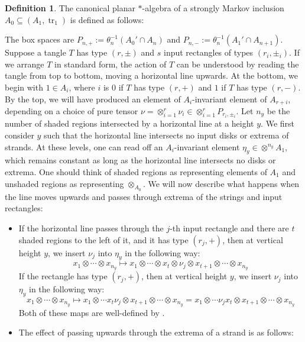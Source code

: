 \documentclass[11pt]{article}
\theoremstyle{plain}
\theoremstyle{definition}
\newtheorem{defn}[thm]{Definition}
\DeclareMathOperator{\tr}{tr}
\begin{document}
\begin{defn} 
The canonical planar $\ast$-algebra of a strongly Markov inclusion $A_0\subseteq (A_1,\tr_1)$ is defined as follows:

	The box spaces are $P_{n,+}:=\theta_n^{-1}(A_0'\cap A_{n}) $ and $P_{n,-}:=\theta_n^{-1}(A_1'\cap A_{n+1})$. Suppose a tangle $T$ has type $(r,\pm)$ and $s$ input rectangles of types $(r_i,\pm_i)$. If we arrange $T$ in standard form, the action of $T$ can be understood by reading the tangle from top to bottom, moving a horizontal line upwards. At the bottom, we begin with $1\in A_i$, where $i$ is $0$ if $T$ has type $(r,+)$ and $1$ if $T$ has type $(r,-)$. By the top, we will have produced an element of $A_i$-invariant element of $A_{r+i}$, depending on a choice of pure tensor $\nu=\otimes_{i=1}^r\nu_i\in\otimes_{i=1}^rP_{r_i,\pm_i}$. Let $n_y$ be the number of shaded regions intersected by a horizontal line at a height $y$. We first consider $y$ such that the horizontal line intersects no input disks or extrema of strands. At these levels, one can read off an $A_i$-invariant element $\eta_y\in \otimes^{n_y}A_1$, which remains constant as long as the horizontal line intersects no disks or extrema. One should think of shaded regions as representing elements of $A_1$ and unshaded regions as representing $\otimes_{A_0}$. We will now describe what happens when the line moves upwards and passes through extrema of the strings and input rectangles:
	\begin{itemize}
	\item If the horizontal line passes through the $j$-th input rectangle and there are $t$ shaded regions to the left of it, and it has type $(r_j,+)$, then at vertical height $y$, we insert $\nu_j$ into $\eta_y$ in the following way:
	\[
	x_1\otimes\cdots \otimes x_{n_y} 
	\mapsto 
	x_1\otimes \cdots\otimes x_t\otimes \nu_j \otimes x_{t+1}\otimes \cdots\otimes x_{n_y}
	\]
	 If the rectangle has type $(r_j,+)$, then at vertical height $y$, we insert $\nu_j$ into	$\eta_y$ in the following way:
	\[
	x_1\otimes\cdots \otimes x_{n_y} 
	\mapsto 
	x_1\otimes \cdots x_t \nu_j \otimes x_{t+1}\otimes \cdots \otimes x_{n_y}
	=
	x_1\otimes \cdots \nu_j x_t  \otimes x_{t+1}\otimes \cdots \otimes x_{n_y}
	\]
	Both of these maps are well-defined by \cite[Lem.~2.29]{MR2812459}.
	\item The effect of passing upwards through the extrema of a strand is as follows: 
\begin{align*}
	&\begin{tikzpicture}[scale=0.6, baseline = -.1cm]

\end{tikzpicture}
\end{align*}
\end{itemize}
\end{defn}
\end{document}
